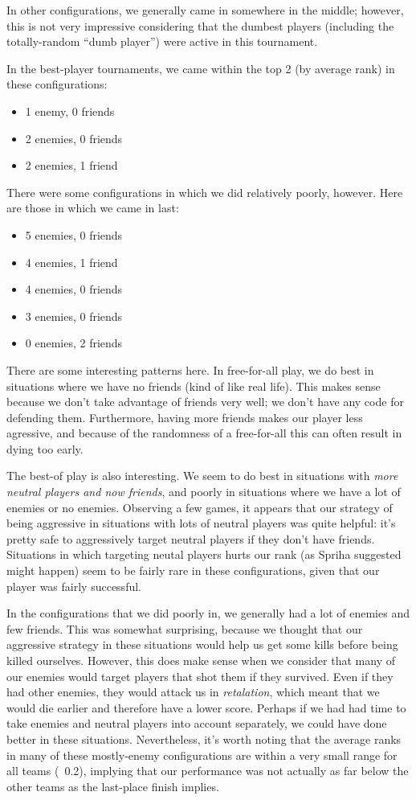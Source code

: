 \documentclass[
10pt, %
letterpaper, %
oneside, %
headinclude,footinclude, %
english
]{article}
\begin{document}
In other configurations, we generally came in somewhere in the middle; however, this is not very impressive considering that the dumbest players (including the totally-random ``dumb player'') were active in this tournament.

In the best-player tournaments, we came within the top 2 (by average rank) in these configurations:
\begin{itemize}
  \item 1 enemy, 0 friends
  \item 2 enemies, 0 friends
  \item 2 enemies, 1 friend
\end{itemize}

There were some configurations in which we did relatively poorly, however. Here are those in which we came in last:
\begin{itemize}
  \item 5 enemies, 0 friends
  \item 4 enemies, 1 friend
  \item 4 enemies, 0 friends
  \item 3 enemies, 0 friends
  \item 0 enemies, 2 friends
\end{itemize}

There are some interesting patterns here. In free-for-all play, we do best in situations where we have no friends (kind of like real life). This makes sense because we don't take advantage of friends very well; we don't have any code for defending them. Furthermore, having more friends makes our player less agressive, and because of the randomness of a free-for-all this can often result in dying too early.

The best-of play is also interesting. We seem to do best in situations with \textit{more neutral players and now friends}, and poorly in situations where we have a lot of enemies or no enemies. Observing a few games, it appears that our strategy of being aggressive in situations with lots of neutral players was quite helpful: it's pretty safe to aggressively target neutral players if they don't have friends. Situations in which targeting neutal players hurts our rank (as Spriha suggested might happen) seem to be fairly rare in these configurations, given that our player was fairly successful.

In the configurations that we did poorly in, we generally had a lot of enemies and few friends. This was somewhat surprising, because we thought that our aggressive strategy in these situations would help us get some kills before being killed ourselves. However, this does make sense when we consider that many of our enemies would target players that shot them if they survived. Even if they had other enemies, they would attack us in \textit{retalation}, which meant that we would die earlier and therefore have a lower score. Perhaps if we had had time to take enemies and neutral players into account separately, we could have done better in these situations. Nevertheless, it's worth noting that the average ranks in many of these mostly-enemy configurations are within a very small range for all teams (~0.2), implying that our performance was not actually as far below the other teams as the last-place finish implies.
\end{document}
